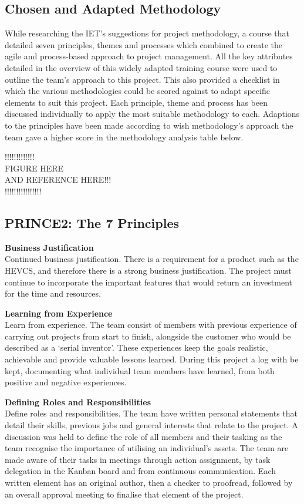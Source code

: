 \documentclass [12pt]{article}
\begin{document}
\subsection{Chosen and Adapted Methodology}\label{sec:chosen_methodology}
While researching the IET’s suggestions for project methodology, a course that detailed seven principles, themes and processes which combined to create the \cite{PRINCE2} agile and process-based approach to project management. All the key attributes detailed in the overview of this widely adapted training course were used to outline the team’s approach to this project. This also provided a checklist in which the various methodologies could be scored against to adapt specific elements to suit this project. Each principle, theme and process has been discussed individually to apply the most suitable methodology to each. Adaptions to the principles have been made according to wish methodology’s approach the team gave a higher score in the methodology analysis table below.

!!!!!!!!!!!!! \\
FIGURE HERE \\
AND REFERENCE HERE!!! \\
!!!!!!!!!!!!!!!! \\


\subsection{PRINCE2: The 7 Principles}\label{sec:7_principles}

\textbf{Business Justification} \\
Continued business justification. There is a requirement for a product such as the HEVCS, and therefore there is a strong business justification. The project must continue to incorporate the important features that would return an investment for the time and resources.

\textbf{Learning from Experience} \\
Learn from experience. The team consist of members with previous experience of carrying out projects from start to finish, alongside the customer who would be described as a ‘serial inventor’. These experiences keep the goals realistic, achievable and provide valuable lessons learned. During this project a log with be kept, documenting what individual team members have learned, from both positive and negative experiences.

\textbf{Defining Roles and Responsibilities} \\
Define roles and responsibilities. The team have written personal statements that detail their skills, previous jobs and general interests that relate to the project. A discussion was held to define the role of all members and their tasking as the team recognise the importance of utilising an individual’s assets. The team are made aware of their tasks in meetings through action assignment, by task delegation in the Kanban board and from continuous communication. Each written element has an original author, then a checker to proofread, followed by an overall approval meeting to finalise that element of the project.
\end{document}
